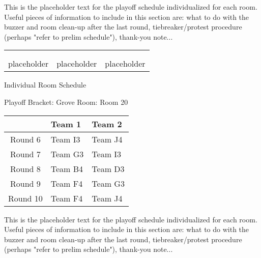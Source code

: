 \documentclass{article}%
\begin{document}
\vspace*{16pt}%
\linebreak%
This is the placeholder text for the playoff schedule individualized for each room. Useful pieces of information to include in this section are: what to do with the buzzer and room clean{-}up after the last round, tiebreaker/protest procedure (perhaps "refer to prelim schedule"), thank{-}you note...%
\vspace*{30pt}%
\newline%
%
\begin{tabularx}{\textwidth}{YYY}%
  &  &  \\%
\\%
placeholder&placeholder&placeholder\\%
\end{tabularx}%
\newpage%
\begin{center}%
\begin{Huge}%
Individual Room Schedule%
\end{Huge}%
\vspace*{16pt}%
\linebreak%
\begin{Large}%
Playoff Bracket: Grove \hfill Room: Room 20%
\end{Large}%
\end{center}%
%
\begin{tabularx}{\textwidth}{|c|Y|Y|}%
\hline%
&Team 1&Team 2\\%
\hline%
Round 6&Team I3&Team J4\\%
Round 7&Team G3&Team I3\\%
Round 8&Team B4&Team D3\\%
Round 9&Team F4&Team G3\\%
Round 10&Team F4&Team J4\\%
\hline%
\end{tabularx}%
\vspace*{16pt}%
\linebreak%
This is the placeholder text for the playoff schedule individualized for each room. Useful pieces of information to include in this section are: what to do with the buzzer and room clean{-}up after the last round, tiebreaker/protest procedure (perhaps "refer to prelim schedule"), thank{-}you note...%
\vspace*{30pt}%
\newline%
\end{document}
